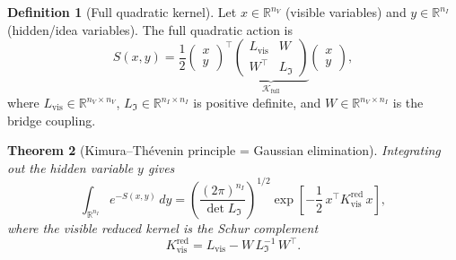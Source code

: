 \documentclass[12pt]{article}
\theoremstyle{plain}
\newtheorem{theorem}{Theorem}[section]
\theoremstyle{definition}
\newtheorem{definition}[theorem]{Definition}
\numberwithin{equation}{section}
\newcommand{\R}{\mathbb{R}}
\newcommand{\vis}{\mathrm{vis}}
\newcommand{\red}{\mathrm{red}}
\newcommand{\fI}{\mathfrak{I}}
\begin{document}
\begin{definition}[Full quadratic kernel]
Let $x\in\R^{n_V}$ (visible variables) and $y\in\R^{n_I}$ (hidden/idea
variables).  The full quadratic action is
\begin{equation}
S(x,y) = \frac{1}{2}
\begin{pmatrix}x\\y\end{pmatrix}^{\!\top}
\underbrace{\begin{pmatrix}
L_{\vis} & W\\
W^\top & L_{\fI}
\end{pmatrix}}_{\mathcal{K}_{\mathrm{full}}}
\begin{pmatrix}x\\y\end{pmatrix},
\end{equation}
where $L_{\vis}\in\R^{n_V\times n_V}$, $L_{\fI}\in\R^{n_I\times n_I}$
is positive definite, and $W\in\R^{n_V\times n_I}$ is the bridge
coupling.
\end{definition}

\begin{theorem}[Kimura--Th\'evenin principle = Gaussian elimination]\label{thm:KT}
Integrating out the hidden variable $y$ gives
\begin{equation}\label{eq:gausselim}
\int_{\R^{n_I}} e^{-S(x,y)}\,dy
= \left(\frac{(2\pi)^{n_I}}{\det L_{\fI}}\right)^{1/2}
\exp\!\left[-\frac{1}{2}\,x^\top K_{\vis}^{\red}\,x\right],
\end{equation}
where the visible reduced kernel is the Schur complement
\begin{equation}\label{eq:schur}
\boxed{K_{\vis}^{\red} = L_{\vis} - W\,L_{\fI}^{-1}\,W^\top.}
\end{equation}
\end{theorem}
\end{document}
